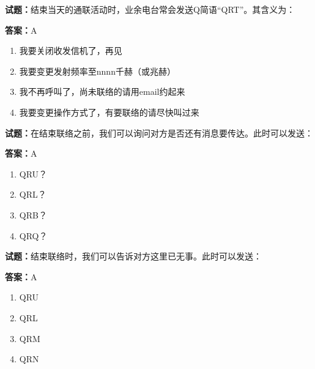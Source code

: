 \documentclass{ctexbook}
\begin{document}




\vspace{1em}

\textbf{试题：}结束当天的通联活动时，业余电台常会发送Q简语“QRT”。其含义为： 

\textbf{答案：}A 

\begin{enumerate}[leftmargin=3em]
  \item 我要关闭收发信机了，再见 

  \item 我要变更发射频率至nnnn千赫（或兆赫） 

  \item 我不再呼叫了，尚未联络的请用email约起来 

  \item 我要变更操作方式了，有要联络的请尽快叫过来 

\end{enumerate}





\vspace{1em}

\textbf{试题：}在结束联络之前，我们可以询问对方是否还有消息要传达。此时可以发送： 

\textbf{答案：}A 

\begin{enumerate}[leftmargin=3em]
  \item QRU？ 

  \item QRL？ 

  \item QRB？ 

  \item QRQ？ 

\end{enumerate}





\vspace{1em}

\textbf{试题：}结束联络时，我们可以告诉对方这里已无事。此时可以发送： 

\textbf{答案：}A 

\begin{enumerate}[leftmargin=3em]
  \item QRU 

  \item QRL 

  \item QRM 

  \item QRN 

\end{enumerate}
\end{document}
